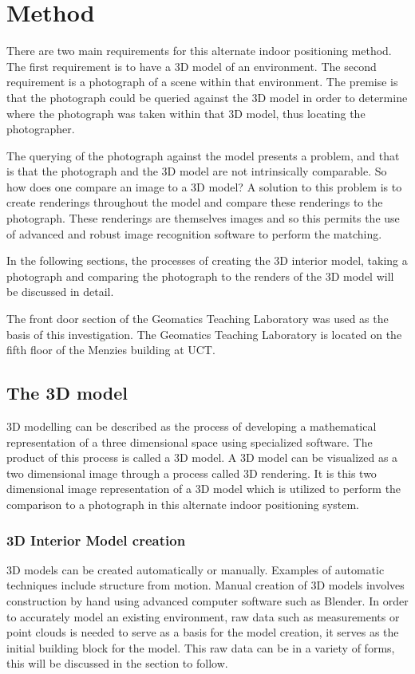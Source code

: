 \documentclass[11pt,a4paper]{report}
\begin{document}
\newpage
\chapter{Method}
	There are two main requirements for this alternate indoor positioning method. The first requirement is to have a 3D model of an environment. The second requirement is a photograph of a scene within that environment. The premise is that the photograph could be queried against the 3D model in order to determine where the photograph was taken within that 3D model, thus locating the photographer.
	
	The querying of the photograph against the model presents a problem, and that is that the photograph and the 3D model are not intrinsically comparable. So how does one compare an image to a 3D model? A solution to this problem is to create renderings throughout the model and compare these renderings to the photograph. These renderings are themselves images and so this permits the use of advanced and robust image recognition software to perform the matching.
	
	In the following sections, the processes of creating the 3D interior model, taking a photograph and comparing the photograph to the renders of the 3D model will be discussed in detail.
	
	The front door section of the Geomatics Teaching Laboratory was used as the basis of this investigation. The Geomatics Teaching Laboratory is located on the fifth floor of the Menzies building at UCT.
		
	\section{The 3D model}
		3D modelling can be described as the process of developing a mathematical representation of a three dimensional space using specialized software. The product of this process is called a 3D model. A 3D model can be visualized as a two dimensional image through a process called 3D rendering. It is this two dimensional image representation of a 3D model which is utilized to perform the comparison to a photograph in this alternate indoor positioning system.
		
		\subsection{3D Interior Model creation}
			3D models can be created automatically or manually. Examples of automatic techniques include structure from motion. Manual creation of 3D models involves construction by hand using advanced computer software such as Blender. In order to accurately model an existing environment, raw data such as measurements or point clouds is needed to serve as a basis for the model creation, it serves as the initial building block for the model. This raw data can be in a variety of forms, this will be discussed in the section to follow.
		
\end{document}
